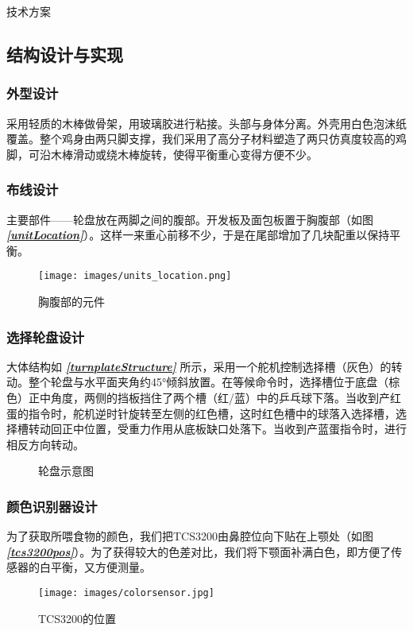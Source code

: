 \documentclass[a4paper,12pt]{ctexart}
\makeatletter
\newcommand{\sectionfontsize}{\fontsize{15pt}{18pt}\selectfont}
\renewcommand{\section}{\@startsection{section}{1}{0mm}
		{-\baselineskip}{0.5\baselineskip}{\sectionfontsize\bf\leftline}}
\newcommand{\aref}[1]{\textbf{\textit{\autoref{#1}}}}
\makeatother
\begin{document}
	\section{技术方案}
		\subsection{结构设计与实现}
			\subsubsection{外型设计}
				采用轻质的木棒做骨架，用玻璃胶进行粘接。头部与身体分离。外壳用白色泡沫纸覆盖。整个鸡身由两只脚支撑，我们采用了高分子材料塑造了两只仿真度较高的鸡脚，可沿木棒滑动或绕木棒旋转，使得平衡重心变得方便不少。
			\subsubsection{布线设计}
				主要部件——轮盘放在两脚之间的腹部。开发板及面包板置于胸腹部（如图\aref{unitLocation}）。这样一来重心前移不少，于是在尾部增加了几块配重以保持平衡。
				\begin{figure}[!ht]
					\centering
					\texttt{[image: images/units\_location.png]}
					\caption{胸腹部的元件}\label{unitLocation}
				\end{figure}
			\subsubsection{选择轮盘设计}
				大体结构如 \aref{turnplateStructure} 所示，采用一个舵机控制选择槽（灰色）的转动。整个轮盘与水平面夹角约45°倾斜放置。在等候命令时，选择槽位于底盘（棕色）正中角度，两侧的挡板挡住了两个槽（红/蓝）中的乒乓球下落。当收到产红蛋的指令时，舵机逆时针旋转至左侧的红色槽，这时红色槽中的球落入选择槽，选择槽转动回正中位置，受重力作用从底板缺口处落下。当收到产蓝蛋指令时，进行相反方向转动。
				
				\begin{figure}[!ht]
					\centering
					\caption{轮盘示意图}\label{turnplateStructure}
				\end{figure}
			\subsubsection{颜色识别器设计}
				为了获取所喂食物的颜色，我们把TCS3200由鼻腔位向下贴在上颚处（如图\aref{tcs3200pos}）。为了获得较大的色差对比，我们将下颚面补满白色，即方便了传感器的白平衡，又方便测量。
				\begin{figure}[!ht]
				\centering
				\texttt{[image: images/colorsensor.jpg]}
				\caption{TCS3200的位置}\label{tcs3200pos}
				\end{figure}
		\clearpage
\end{document}
